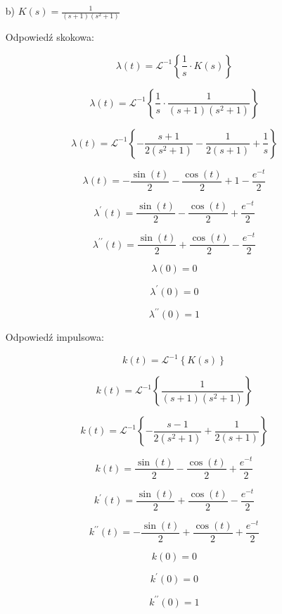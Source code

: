 \documentclass{article}
\begin{document}
\begin{enumerate}
    
    
    
    
    \item[b)]  $K(s)=\frac{1}{\left(s + 1\right) \left(s^{2} + 1\right)}$

    Odpowiedź skokowa:

    $$ \lambda(t)=\mathcal{L}^{-1}\left\{\frac{1}{s}\cdot K(s)\right\} $$

    $$ \lambda(t)=\mathcal{L}^{-1}\left\{\frac{1}{s}\cdot \frac{1}{\left(s + 1\right) \left(s^{2} + 1\right)}\right\} $$

    $$ \lambda(t)= \mathcal{L}^{-1}\left\{- \frac{s + 1}{2 \left(s^{2} + 1\right)} - \frac{1}{2 \left(s + 1\right)} + \frac{1}{s}
    \right\}$$

    $$ \lambda(t)=- \frac{\sin{\left(t \right)}}{2} - \frac{\cos{\left(t \right)}}{2} + 1 - \frac{e^{- t}}{2} $$

    $$ \lambda^{\prime}(t)=\frac{\sin{\left(t \right)}}{2} - \frac{\cos{\left(t \right)}}{2} + \frac{e^{- t}}{2}$$

    $$ \lambda^{\prime\prime}(t)=\frac{\sin{\left(t \right)}}{2} + \frac{\cos{\left(t \right)}}{2} - \frac{e^{- t}}{2}$$

    $$ \lambda(0)= 0 $$

    $$ \lambda^{\prime}(0)= 0 $$

    $$ \lambda^{\prime\prime}(0)= 1 $$

    \newpage


    Odpowiedź impulsowa:

    $$ k(t)=\mathcal{L}^{-1}\left\{K(s)\right\} $$

    $$ k(t)=\mathcal{L}^{-1}\left\{\frac{1}{\left(s + 1\right) \left(s^{2} + 1\right)}\right\} $$

    $$ k(t)=\mathcal{L}^{-1}\left\{- \frac{s - 1}{2 \left(s^{2} + 1\right)} + \frac{1}{2 \left(s + 1\right)}\right\} $$

    $$ k(t)=\frac{\sin{\left(t \right)}}{2} - \frac{\cos{\left(t \right)}}{2} + \frac{e^{- t}}{2}$$

    $$ k^{\prime}(t)=\frac{\sin{\left(t \right)}}{2} + \frac{\cos{\left(t \right)}}{2} - \frac{e^{- t}}{2}$$
    
    $$ k^{\prime\prime}(t)=- \frac{\sin{\left(t \right)}}{2} + \frac{\cos{\left(t \right)}}{2} + \frac{e^{- t}}{2}$$

    $$ k(0)=0$$

    $$ k^{\prime}(0)=0$$

    $$ k^{\prime\prime}(0)=1$$


\end{enumerate}
\end{document}
